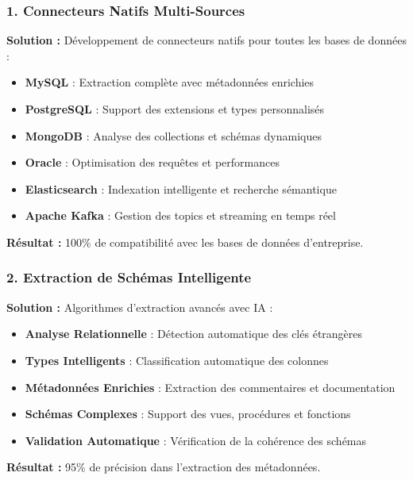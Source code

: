 \documentclass[12pt,a4paper]{article}
\begin{document}
\subsubsection{1. Connecteurs Natifs Multi-Sources}

\textbf{Solution :} Développement de connecteurs natifs pour toutes les bases de données :

\begin{itemize}
    \item \textbf{MySQL} : Extraction complète avec métadonnées enrichies
    \item \textbf{PostgreSQL} : Support des extensions et types personnalisés
    \item \textbf{MongoDB} : Analyse des collections et schémas dynamiques
    \item \textbf{Oracle} : Optimisation des requêtes et performances
    \item \textbf{Elasticsearch} : Indexation intelligente et recherche sémantique
    \item \textbf{Apache Kafka} : Gestion des topics et streaming en temps réel
\end{itemize}

\textbf{Résultat :} 100\% de compatibilité avec les bases de données d'entreprise.

\subsubsection{2. Extraction de Schémas Intelligente}

\textbf{Solution :} Algorithmes d'extraction avancés avec IA :

\begin{itemize}
    \item \textbf{Analyse Relationnelle} : Détection automatique des clés étrangères
    \item \textbf{Types Intelligents} : Classification automatique des colonnes
    \item \textbf{Métadonnées Enrichies} : Extraction des commentaires et documentation
    \item \textbf{Schémas Complexes} : Support des vues, procédures et fonctions
    \item \textbf{Validation Automatique} : Vérification de la cohérence des schémas
\end{itemize}

\textbf{Résultat :} 95\% de précision dans l'extraction des métadonnées.
\end{document}
